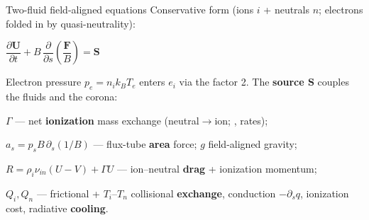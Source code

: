 \documentclass[final, dvipsnames, 20pt]{beamer}
\newlength{\colwidth}
\begin{document}
\begin{frame}[t]
\begin{columns}[t]
\begin{column}{\colwidth}
\begin{block}{Two-fluid field-aligned equations}
Conservative form (ions $i$ + neutrals $n$; electrons folded in by quasi-neutrality):
\begin{eqbox}
\centering
$\dfrac{\partial \mathbf U}{\partial t}
  + B\,\dfrac{\partial}{\partial s}\!\left(\dfrac{\mathbf F}{B}\right)=\mathbf S$
\\[1.6ex]
\end{eqbox}
Electron pressure $p_e=n_ik_BT_e$ enters $e_i$ via the factor 2. The \textbf{source
$\mathbf S$} couples the fluids and the corona:
\begin{compactitem}
  \item $\Gamma$ --- net \textbf{ionization} mass exchange (neutral$\to$ion;
        \citeauthor{Voronov1997}, \citeauthor{Hummer1994} rates);
  \item $a_s=p_sB\,\partial_s(1/B)$ --- flux-tube \textbf{area} force; $g$ field-aligned gravity;
  \item $R=\rho_i\nu_{in}(U-V)+\Gamma U$ --- ion--neutral \textbf{drag} + ionization momentum;
  \item $Q_i,Q_n$ --- frictional + $T_i$--$T_n$ collisional \textbf{exchange}, conduction
        $-\partial_s q$, ionization cost, radiative \textbf{cooling}.
\end{compactitem}
\end{block}


\end{column}
\end{columns}
\end{frame}
\end{document}
